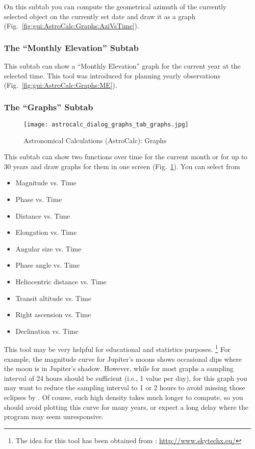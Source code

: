 On this subtab  you can compute the geometrical azimuth of the currently selected object 
on the currently set date and draw it as a graph (Fig.~\ref{fig:gui:AstroCalc:Graphs:AziVsTime}).
    
\subsubsection{The ``Monthly Elevation'' Subtab}
\label{sec:gui:AstroCalc:Graphs:ME}

This subtab  can show a ``Monthly Elevation'' graph for the current year at the selected time.
This tool was introduced for planning yearly observations (Fig.~\ref{fig:gui:AstroCalc:Graphs:ME}).

\subsubsection{The ``Graphs'' Subtab}
\label{sec:gui:AstroCalc:Graphs:Graphs}
    
\begin{figure}[tbp]
\centering\texttt{[image: astrocalc\_dialog\_graphs\_tab\_graphs.jpg]}
\caption{Astronomical Calculations (AstroCalc): Graphs}
\label{fig:gui:AstroCalc:Graphs:Graphs}
\end{figure}
  
This subtab  can show two functions over time for
the current month or for up to 30 years and draw graphs
for them in one screen (Fig.~\ref{fig:gui:AstroCalc:Graphs:Graphs}).
You can select from
\begin{itemize}
\item Magnitude vs. Time
\item Phase vs. Time
\item Distance vs. Time 
\item Elongation vs. Time 
\item Angular size vs. Time
\item Phase angle vs. Time
\item Heliocentric distance vs. Time
\item Transit altitude vs. Time
\item Right ascension vs. Time
\item Declination vs. Time
\end{itemize}

This tool may be very helpful for educational and statistics purposes.%
	\footnote{The idea for this tool has been obtained from : \url{http://www.skytechx.eu/}}
For example, the magnitude curve for Jupiter's moons shows occasional dips where the moon is in Jupiter's shadow.
However, while for most graphs a sampling interval of 24 hours should be sufficient (i.e., 1 value per day),
for this graph you may want to reduce the sampling interval  to 1 or 2 hours to avoid missing those eclipses by .
Of course, such high density takes much longer to compute, so you should avoid plotting this curve for many years,
or expect a long delay where the program may seem unresponsive.
	
